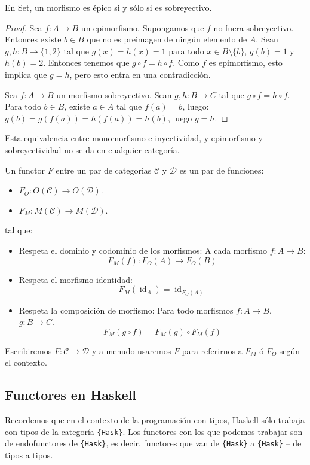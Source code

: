 \documentclass[12pt, twoside]{book}
\newcommand{\code}[1]{\Verb+{#1}+}
\newcommand{\cat}{{\mathcal{C}}}
\newcommand{\Set}{{Set}}
\DeclareMathOperator{\id}{id}
\begin{document}
\begin{proposition}
En \Set, un morfismo es épico si y sólo si es sobreyectivo.
\end{proposition}

\begin{proof}
Sea $f \colon A \to B$ un epimorfismo. Supongamos que $f$ no fuera sobreyectivo. Entonces existe $b \in B$ que no es preimagen de ningún elemento de $A$. Sean $g, h \colon B \to \{1,2\}$ tal que $g(x)=h(x)=1$ para todo $x \in B \setminus \{b\}$, $g(b) = 1$ y $h(b) = 2$. Entonces tenemos que $g \circ f = h \circ f$. Como $f$ es epimorfismo, esto implica que $g = h$, pero esto entra en una contradicción.

Sea $f \colon A \to B$ un morfismo sobreyectivo. Sean $g, h \colon B \to C$ tal que $g \circ f = h \circ f$. Para todo $b \in B$, existe $a \in A$ tal que $f(a)=b$, luego: $g(b) = g(f(a)) = h(f(a)) = h(b)$, luego $g = h$.
\end{proof}

Esta equivalencia entre monomorfismo e inyectividad, y epimorfismo y sobreyectividad no se da en cualquier categoría.

\begin{definition}\label{def:functor}
Un functor $F$ entre un par de categorias $\cat$ y $\mathcal{D}$ es un par de funciones:
\begin{itemize}
\item $F_O : O(\cat) \to O(\mathcal{D})$.
\item $F_M : M(\cat) \to M(\mathcal{D})$.
\end{itemize}
tal que:
\begin{itemize}
\item Respeta el dominio y codominio de los morfismos: A cada morfismo $f : A \to B$:
\[ F_M(f) : F_O(A) \to F_O(B) \]
\item Respeta el morfismo identidad:
\[ F_M(\id_A) = \id_{F_O(A)} \]
\item Respeta la composición de morfismo: Para todo morfismos $f : A \to B$, $g : B \to C$.
\[ F_M(g \circ f) = F_M(g) \circ F_M(f) \]
\end{itemize}
\end{definition}

Escribiremos $F \colon \cat \to \mathcal{D}$ y a menudo usaremos $F$ para referirnos a $F_M$ ó $F_O$ según el contexto.

\subsection{Functores en Haskell}
Recordemos que en el contexto de la programación con tipos, Haskell sólo trabaja con tipos de la categoría \code{Hask}.
Los functores con los que podemos trabajar son de endofunctores de \code{Hask}, es decir, functores que van de \code{Hask} a \code{Hask} -- de tipos a tipos.
\end{document}
